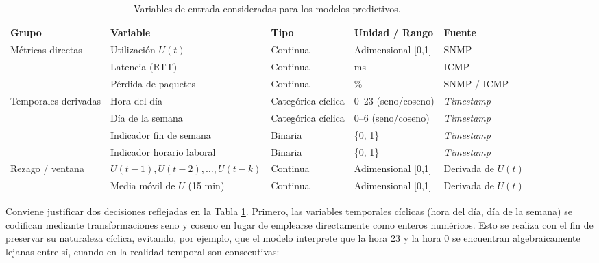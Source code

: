 \documentclass[12pt]{report}
\begin{document}
\begin{table}[H]
    \centering
    \small
    \begin{tabular}{|l|p{3.3cm}|p{2.4cm}|p{2.6cm}|p{2.3cm}|}
        \hline
        \textbf{Grupo} & \textbf{Variable} & \textbf{Tipo} & \textbf{Unidad / Rango} & \textbf{Fuente} \\
        \hline
        \multirow{3}{*}{Métricas directas} 
            & Utilización $U(t)$ & Continua & Adimensional [0,1] & SNMP \\
            \cline{2-5}
            & Latencia (RTT) & Continua & ms & ICMP \\
            \cline{2-5}
            & Pérdida de paquetes & Continua & \% & SNMP / ICMP \\
        \hline
        \multirow{4}{*}{Temporales derivadas}
            & Hora del día & Categórica cíclica & 0--23 (seno/coseno) & \textit{Timestamp} \\
            \cline{2-5}
            & Día de la semana & Categórica cíclica & 0--6 (seno/coseno) & \textit{Timestamp} \\
            \cline{2-5}
            & Indicador fin de semana & Binaria & \{0, 1\} & \textit{Timestamp} \\
            \cline{2-5}
            & Indicador horario laboral & Binaria & \{0, 1\} & \textit{Timestamp} \\
        \hline
        \multirow{2}{*}{Rezago / ventana}
            & $U(t-1), U(t-2), \dots, U(t-k)$ & Continua & Adimensional [0,1] & Derivada de $U(t)$ \\
            \cline{2-5}
            & Media móvil de $U$ (15 min) & Continua & Adimensional [0,1] & Derivada de $U(t)$ \\
        \hline
    \end{tabular}
    \caption{Variables de entrada consideradas para los modelos predictivos.}
    \label{tab:features_entrada}
\end{table}

Conviene justificar dos decisiones reflejadas en la Tabla \ref{tab:features_entrada}. Primero, las variables temporales cíclicas (hora del día, día de la semana) se codifican mediante transformaciones seno y coseno en lugar de emplearse directamente como enteros numéricos. Esto se realiza con el fin de preservar su naturaleza cíclica, evitando, por ejemplo, que el modelo interprete que la hora 23 y la hora 0 se encuentran algebraicamente lejanas entre sí, cuando en la realidad temporal son consecutivas:
\end{document}
